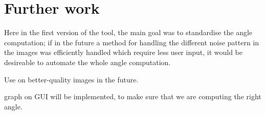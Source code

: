 \section{Further work}

Here in the first version of the tool, the main goal was to standardise the angle computation; if in the future  a method for handling the different noise pattern in the images was efficiently handled which require less user input, it would be desireable to automate the whole angle computation.

Use on better-quality images in the future.


graph on GUI will be implemented, to make sure that we are computing the right angle.


